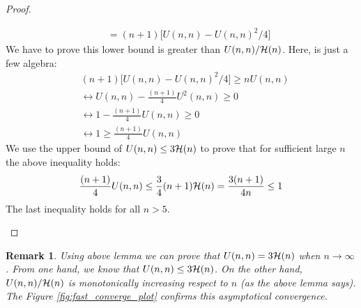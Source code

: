 \documentclass{article}
\newtheorem{remark}[definition]{Remark}
\newcommand{\bound}{{\cal H}}
\begin{document}
\begin{proof}
\begin{itemize}
\begin{eqnarray*}
	    	& & = (n+1) \bigg[U(n,n) -
	    	U(n,n)^2/4\bigg]
	    \end{eqnarray*}
	    We have to prove this lower bound is greater than $U(n,n)/\bound(n)$. Here,
	    is just a few algebra: 
	    \begin{eqnarray*}
	    	& (n+1) \bigg[U(n,n) -
	    	U(n,n)^2/4\bigg] \geq n U(n,n) \\
	    	& \leftrightarrow U(n,n) - \frac{(n+1)}{4} U^2(n,n) \geq 0 \\ 
	    	& \leftrightarrow 1- \frac{(n+1)}{4} U(n,n) \geq 0 \\ 
	    	& \leftrightarrow 1\geq \frac{(n+1)}{4} U(n,n)
	    \end{eqnarray*}
	    We use the upper bound of $U(n,n) \leq 3 \bound(n)$ to prove that for
	    sufficient large $n$ the above inequality holds: 
	    \begin{equation*}
	    	\frac{(n+1)}{4} U(n,n) \leq \frac{3}{4}  (n+1)\bound(n) = \frac{3(n+1)}{4
	    	n} \leq 1 
	    \end{equation*}
	    The last inequality holds for all $n>5$. 
	\end{itemize}
\end{proof}
\begin{remark}
	Using above lemma we can prove that $U(n,n) = 3 \bound(n)$ when $n\rightarrow
	\infty$.
	From one hand, we know that $U(n,n) \leq 3 \bound(n)$. On the other hand, 
	$U(n,n)/\bound(n)$ is monotonically increasing respect to $n$ (as the above
	lemma says). The Figure \ref{fig:fast_converge_plot} confirms this asymptotical
	convergence.
\end{remark}
\end{document}
